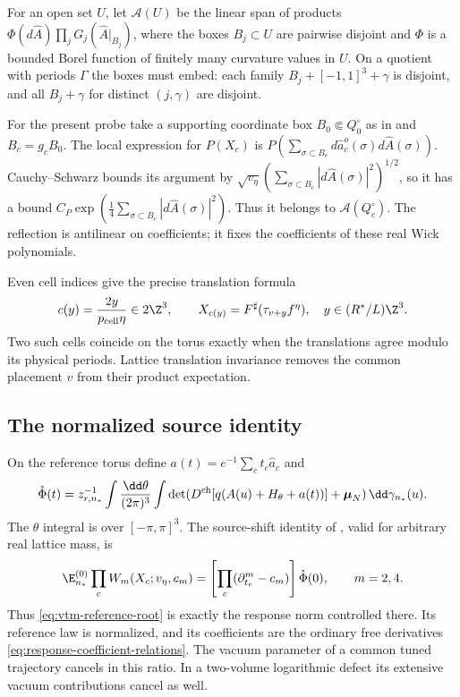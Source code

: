 For an open set $U$, let $\mathcal A(U)$ be the linear span
of products $\Phi(d\widehat A)\prod_jG_j(\widehat A|_{B_j})$,
where the boxes $B_j\subset U$ are pairwise disjoint and
$\Phi$ is a bounded Borel function of finitely many curvature
values in $U$. On a quotient with periods $\Gamma$ the boxes
must embed: each family $B_j+[-1,1]^3+\gamma$ is disjoint,
and all $B_j+\gamma$ for distinct $(j,\gamma)$ are disjoint.

For the present probe take a supporting coordinate box
$B_0\Subset Q_0^\circ$ as in \cite[\S2.2]{ReferenceResponse}
and $B_c=g_cB_0$. The local expression for $P(X_c)$ is
$P(\sum_{\sigma\subset B_c}d\widehat a_c^o(\sigma)
                                      d\widehat A(\sigma))$.
Cauchy--Schwarz bounds its argument by
$\sqrt{v_\eta}(\sum_{\sigma\subset B_c}|d\widehat A(\sigma)|^2)^{1/2}$,
so it has a bound
$C_P\exp(\frac14\sum_{\sigma\subset B_c}|d\widehat A(\sigma)|^2)$.
Thus it belongs to $\mathcal A(Q_c^\circ)$.
The reflection is antilinear on coefficients; it fixes the
coefficients of these real Wick polynomials.

Even cell indices give the precise translation formula
\begin{equation}\label{eq:cells-translation-observable}
 c(y)=\frac{2y}{p_{\rm cell}\eta}\in2\Z^3,\qquad
 X_{c(y)}=F^\sharp(\tau_{v+y}f^\eta),
 \quad y\in(R^*/L)\Z^3.
\end{equation}
Two such cells coincide on the torus exactly when the
translations agree modulo its physical periods. Lattice
translation invariance removes the common placement $v$
from their product expectation.

\subsection{The normalized source identity}

On the reference torus define $a(t)=e^{-1}\sum_ct_c\widehat a_c$ and
\begin{equation}\label{eq:external-reference-partition}
 \mathring\Phi(t)=z_{r,n_*}^{-1}
 \int\frac{\dd\theta}{(2\pi)^3}\int
 \det(D^{\rm ch}[q(A(u)+H_\theta+a(t))]
                         +\boldsymbol\mu_N)\,\dd\gamma_{n_*}(u).
\end{equation}
The $\theta$ integral is over $[-\pi,\pi]^3$.
The source-shift identity of
\cite[\S3.6, Proposition~3.2 and (53)]{ReferenceResponse},
valid for arbitrary real lattice mass, is
\begin{equation}\label{eq:external-Wick-product}
 \E^{(0)}_{n_*}\prod_c W_m(X_c;v_\eta,c_m)
       =\left[\prod_c(\partial_{t_c}^m-c_m)\right]\mathring\Phi(0),
       \qquad m=2,4.
\end{equation}
Thus \eqref{eq:vtm-reference-root} is exactly the response norm
controlled there. Its reference law is normalized, and its
coefficients are the ordinary free derivatives
\eqref{eq:response-coefficient-relations}. The vacuum parameter
of a common tuned trajectory cancels in this ratio. In a
two-volume logarithmic defect its extensive vacuum contributions
cancel as well.

